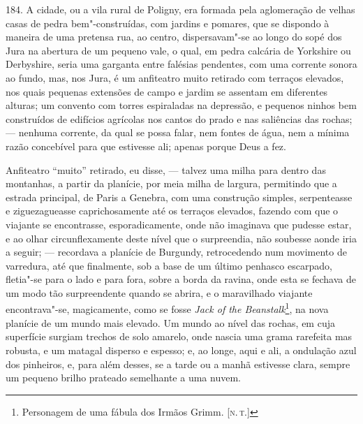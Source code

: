 184. A cidade, ou a vila rural de Poligny, era formada pela aglomeração
de velhas casas de pedra bem"-construídas, com jardins e pomares, que se
dispondo à maneira de uma pretensa rua, ao centro, dispersavam"-se ao
longo do sopé dos Jura na abertura de um pequeno vale, o qual, em pedra
calcária de Yorkshire ou Derbyshire, seria uma garganta entre falésias
pendentes, com uma corrente sonora ao fundo, mas, nos Jura, é um
anfiteatro muito retirado com terraços elevados, nos quais pequenas
extensões de campo e jardim se assentam em diferentes alturas; um
convento com torres espiraladas na depressão, e pequenos ninhos bem
construídos de edifícios agrícolas nos cantos do prado e nas saliências
das rochas; --- nenhuma corrente, da qual se possa falar, nem fontes de
água, nem a mínima razão concebível para que estivesse ali; apenas
porque Deus a fez.

Anfiteatro ``muito'' retirado, eu disse, --- talvez uma milha para dentro
das montanhas, a partir da planície, por meia milha de largura,
permitindo que a estrada principal, de Paris a Genebra, com uma
construção simples, serpenteasse e ziguezagueasse caprichosamente até os
terraços elevados, fazendo com que o viajante se encontrasse,
esporadicamente, onde não imaginava que pudesse estar, e ao olhar
circunflexamente deste nível que o surpreendia, não soubesse aonde iria
a seguir; --- recordava a planície de Burgundy, retrocedendo num
movimento de varredura, até que finalmente, sob a base de um último
penhasco escarpado, fletia"-se para o lado e para fora, sobre a borda da
ravina, onde esta se fechava de um modo tão surpreendente quando se
abrira, e o maravilhado viajante encontrava"-se, magicamente, como se
fosse \emph{Jack of the Beanstalk}\footnote{Personagem de uma fábula dos
  Irmãos Grimm. {[}\textsc{n.\,t.}{]}}, na nova planície de um mundo mais
elevado. Um mundo ao nível das rochas, em cuja superfície surgiam
trechos de solo amarelo, onde nascia uma grama rarefeita mas robusta, e
um matagal disperso e espesso; e, ao longe, aqui e ali, a ondulação azul
dos pinheiros, e, para além desses, se a tarde ou a manhã estivesse
clara, sempre um pequeno brilho prateado semelhante a uma nuvem.

